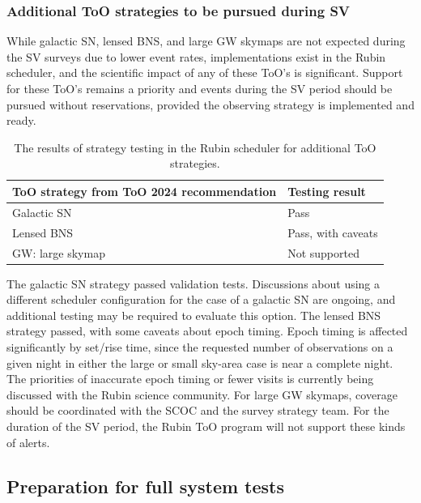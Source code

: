 \subsubsection{Additional ToO strategies to be pursued during SV}\label{subsubsec:SVOptionalValidation}

While galactic SN, lensed BNS, and large GW skymaps are not expected during the SV surveys due to lower event rates, implementations exist in the Rubin scheduler, and the scientific impact of any of these ToO's is significant. Support for these ToO's remains a priority and events during the SV period should be pursued without reservations, provided the observing strategy is implemented and ready.

\begin{table}[]
\centering
\begin{tabular}{|l|l|}
\hline
\textbf{ToO strategy from ToO 2024 recommendation} & \textbf{Testing result}       \\ \hline
Galactic SN                              & Pass                 \\ \hline
Lensed BNS                              & Pass, with caveats                 \\ \hline
GW: large skymap                              & Not supported                 \\ \hline
\end{tabular}
\caption{The results of strategy testing in the Rubin scheduler for additional ToO strategies.}
\label{tab:SVOptionalStrategy results}
\end{table}

The galactic SN strategy passed validation tests. Discussions about using a different scheduler configuration for the case of a galactic SN are ongoing, and additional testing may be required to evaluate this option. The lensed BNS strategy passed, with some caveats about epoch timing. Epoch timing is affected significantly by set/rise time, since the requested number of observations on a given night in either the large or small sky-area case is near a complete night. The priorities of inaccurate epoch timing or fewer visits is currently being discussed with the Rubin science community. For large GW skymaps, coverage should be coordinated with the SCOC and the survey strategy team. For the duration of the SV period, the Rubin ToO program will not support these kinds of alerts.

\subsection{Preparation for full system tests}\label{subsec:systemTests verification}

